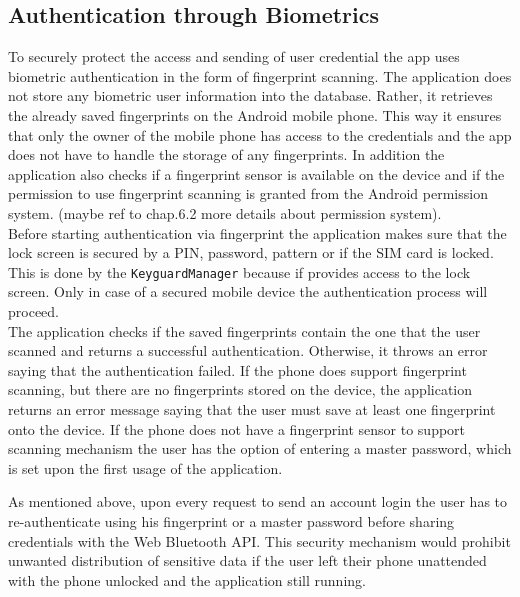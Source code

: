 
\subsection{Authentication through Biometrics}
To securely protect the access and sending of user credential the app uses biometric authentication in the form of fingerprint scanning. The application does not store any biometric user information into the database. Rather, it retrieves the already saved fingerprints on the Android mobile phone. This way it ensures that only the owner of the mobile phone has access to the credentials and the app does not have to handle the storage of any fingerprints. In addition the application also checks if a fingerprint sensor is available on the device and if the permission to use fingerprint scanning is granted from the Android permission system. (maybe ref to chap.6.2 more details about permission system). \\
Before starting authentication via fingerprint the application makes sure that the lock screen is secured by a PIN, password, pattern or if the SIM card is locked. This is done by the \texttt{KeyguardManager} because if provides access to the lock screen. Only in case of a secured mobile device the authentication process will proceed. \\

The application checks if the saved fingerprints contain the one that the user scanned and returns a successful authentication. Otherwise, it throws an error saying that the authentication failed.  If the phone does support fingerprint scanning, but there are no fingerprints stored on the device, the application returns an error message saying that the user must save at least one fingerprint onto the device. If the phone does not have a fingerprint sensor to support scanning mechanism the user has the option of entering a master password, which is set upon the first usage of the application. 

As mentioned above, upon every request to send an account login the user has to re-authenticate using his fingerprint or a master password before sharing credentials with the Web Bluetooth API. This security mechanism would prohibit unwanted distribution of sensitive data if the user left their phone unattended with the phone unlocked and the application still running.



